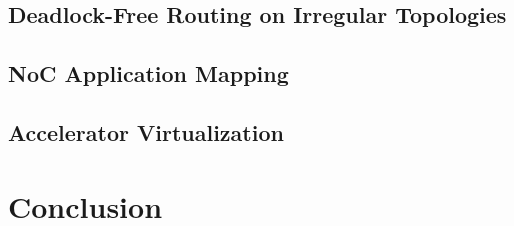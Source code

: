 \documentclass[sigconf, screen, review]{acmart}
\begin{document}
\subsection{Deadlock-Free Routing on Irregular Topologies}

\subsection{NoC Application Mapping}

\subsection{Accelerator Virtualization}

\section{Conclusion}
\label{sec:conclusion}
\end{document}
